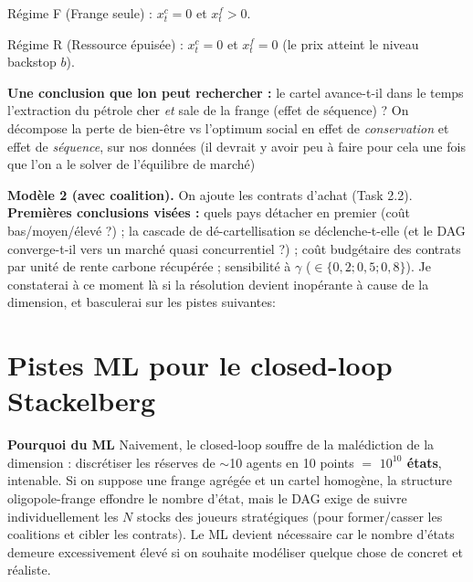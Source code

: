 \documentclass[11pt]{article}
\begin{document}
Régime F (Frange seule) : $x^c_t = 0$ et $x^f_t > 0$. 

Régime R (Ressource épuisée) : $x^c_t = 0$ et $x^f_t = 0$ (le prix atteint le niveau backstop $b$).

\textbf{Une conclusion que lon peut rechercher :} le cartel avance-t-il dans le temps l'extraction du pétrole cher
\emph{et} sale de la frange (effet de séquence) ? On décompose la perte de bien-\^etre vs l'optimum
social en effet de \emph{conservation} et effet de \emph{séquence}, sur nos données (il devrait y avoir peu à faire pour cela une fois que l'on a le solver de l'équilibre de marché)




\textbf{Modèle 2 (avec coalition).} On ajoute les contrats d'achat (Task 2.2). \textbf{Premières conclusions visées :}
quels pays détacher en premier (co\^ut bas/moyen/élevé ?) ; la cascade de dé-cartellisation se déclenche-t-elle (et le DAG converge-t-il vers un marché quasi concurrentiel ?) ; co\^ut budgétaire des contrats par unité de rente carbone récupérée ; sensibilité à $\gamma$ ($\in\{0{,}2;0{,}5;0{,}8\}$). Je constaterai à ce moment là si la résolution devient inopérante à cause de la dimension, et basculerai sur les pistes suivantes:  

\section{Pistes ML pour le closed-loop Stackelberg}



\textbf{Pourquoi du ML} Naivement, le closed-loop souffre de la malédiction de la dimension : discrétiser
les réserves de $\sim$10 agents en 10 points $=$ \textbf{$10^{10}$ états}, intenable. Si on suppose une frange agrégée et un cartel homogène, la structure oligopole-frange effondre le nombre d'état, mais le DAG exige de suivre individuellement les $N$ stocks des joueurs stratégiques (pour former/casser les coalitions et cibler les contrats). Le ML devient nécessaire car le nombre d'états demeure excessivement élevé si on souhaite modéliser quelque chose de concret et réaliste. 
\end{document}
